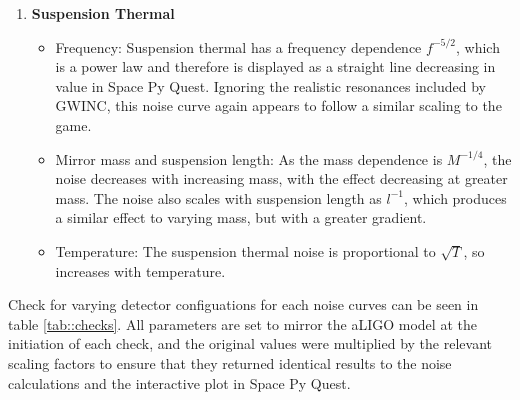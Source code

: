 \documentclass{article}
\begin{document}
\begin{enumerate}
    \item \textbf{Suspension Thermal}
    \begin{itemize}
   \item Frequency: Suspension thermal has a frequency dependence
     $f^{-5/2}$, which is a power law and therefore is displayed as a
     straight line decreasing in value in Space Py Quest. Ignoring the
     realistic resonances included by GWINC, this noise curve again
     appears to follow a similar scaling to the game. 
   \item Mirror mass and suspension length: As the mass dependence is
     $M^{-1/4}$, the noise decreases with increasing mass, with the
     effect decreasing at greater mass. The noise also scales with
     suspension length as $l^{-1}$, which produces a similar effect to
     varying mass, but with a greater gradient. 
   \item Temperature: The suspension thermal noise is proportional to
     $\sqrt{T}$, so increases with temperature. 
 \end{itemize}
\end{enumerate}
Check for varying detector configuations for each noise curves can be
seen in table \ref{tab::checks}. All parameters are set to mirror the
aLIGO model at the initiation of each check, and the original values
were multiplied by the relevant scaling factors to ensure that they
returned identical results to the noise calculations and the
interactive plot in Space Py Quest. 
\end{document}
